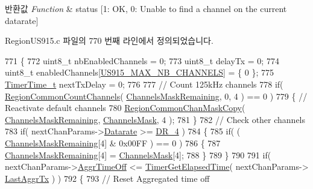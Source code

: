 \begin{DoxyRetVals}{반환값}
{\em Function} & status \mbox{[}1\+: OK, 0\+: Unable to find a channel on the current datarate\mbox{]} \\
\hline
\end{DoxyRetVals}


Region\+U\+S915.\+c 파일의 770 번째 라인에서 정의되었습니다.


\begin{DoxyCode}
771 \{
772     uint8\_t nbEnabledChannels = 0;
773     uint8\_t delayTx = 0;
774     uint8\_t enabledChannels[\mbox{\hyperlink{group___r_e_g_i_o_n_u_s915_ga417ab6531cbaef476634d7ba0b04c20f}{US915\_MAX\_NB\_CHANNELS}}] = \{ 0 \};
775     \mbox{\hyperlink{utilities_8h_a4215ca43d3e953099ea758ce428599d0}{TimerTime\_t}} nextTxDelay = 0;
776 
777     \textcolor{comment}{// Count 125kHz channels}
778     \textcolor{keywordflow}{if}( \mbox{\hyperlink{group___r_e_g_i_o_n_c_o_m_m_o_n_gac23f0831812f610f57f42f6cf87368c9}{RegionCommonCountChannels}}( 
      \mbox{\hyperlink{_region_u_s915_8c_a567333cec639a004655cc1717e9d0928}{ChannelsMaskRemaining}}, 0, 4 ) == 0 )
779     \{ \textcolor{comment}{// Reactivate default channels}
780         \mbox{\hyperlink{group___r_e_g_i_o_n_c_o_m_m_o_n_ga95f5199d490113269fae7f2e0569e9a0}{RegionCommonChanMaskCopy}}( \mbox{\hyperlink{_region_u_s915_8c_a567333cec639a004655cc1717e9d0928}{ChannelsMaskRemaining}}, 
      \mbox{\hyperlink{_region_u_s915_8c_a2188957b5ca6af8092154d7ccbfa5757}{ChannelsMask}}, 4  );
781     \}
782     \textcolor{comment}{// Check other channels}
783     \textcolor{keywordflow}{if}( nextChanParams->\mbox{\hyperlink{structs_next_chan_params_ae2f6080f3aa0e9485c55513ca56bb24d}{Datarate}} >= \mbox{\hyperlink{group___r_e_g_i_o_n_ga6ceba6158a7dab238e9d0b846fb47a0c}{DR\_4}} )
784     \{
785         \textcolor{keywordflow}{if}( ( \mbox{\hyperlink{_region_u_s915_8c_a567333cec639a004655cc1717e9d0928}{ChannelsMaskRemaining}}[4] & 0x00FF ) == 0 )
786         \{
787             \mbox{\hyperlink{_region_u_s915_8c_a567333cec639a004655cc1717e9d0928}{ChannelsMaskRemaining}}[4] = \mbox{\hyperlink{_region_u_s915_8c_a2188957b5ca6af8092154d7ccbfa5757}{ChannelsMask}}[4];
788         \}
789     \}
790 
791     \textcolor{keywordflow}{if}( nextChanParams->\mbox{\hyperlink{structs_next_chan_params_a3609676d2d3b7c00e25615324b35cb26}{AggrTimeOff}} <= \mbox{\hyperlink{time_server_8c_a9ca7e27f3d6474daff63f2e093a2e91e}{TimerGetElapsedTime}}( nextChanParams->
      \mbox{\hyperlink{structs_next_chan_params_a381b728f60b185ecf3313e974c18768b}{LastAggrTx}} ) )
792     \{
793         \textcolor{comment}{// Reset Aggregated time off}

\end{DoxyCode}
